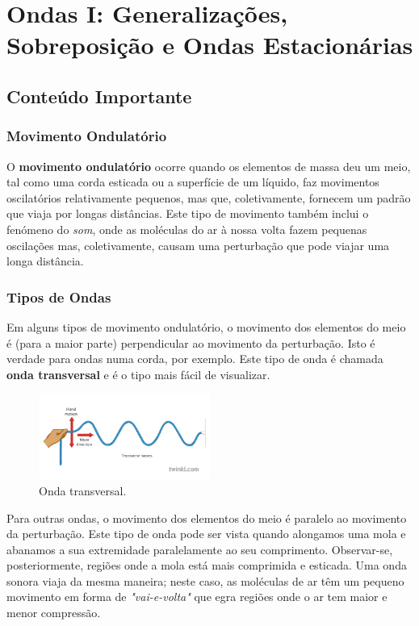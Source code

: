\section{Ondas I: Generalizações, Sobreposição e Ondas Estacionárias}
\subsection{Conteúdo Importante}
\subsubsection{Movimento Ondulatório}

O \textbf{movimento ondulatório} ocorre quando os elementos de massa deu um meio, tal como uma corda esticada ou a superfície de um líquido, faz movimentos oscilatórios relativamente pequenos, mas que, coletivamente, fornecem um padrão que viaja por longas distâncias. Este tipo de movimento também inclui o fenómeno do \emph{som}, onde as moléculas do ar à nossa volta fazem pequenas oscilações mas, coletivamente, causam uma perturbação que pode viajar uma longa distância.

\subsubsection{Tipos de Ondas}
Em alguns tipos de movimento ondulatório, o movimento dos elementos do meio é (para a maior parte) perpendicular ao movimento da perturbação. Isto é verdade para ondas numa corda, por exemplo. Este tipo de onda é chamada \textbf{onda transversal} e é o tipo mais fácil de visualizar.

\begin{figure}[h!]
    \centering
    \includegraphics[width=0.5\textwidth]{11/fig/Transverse-Waves.png}
    \caption{Onda transversal.}
\end{figure}

Para outras ondas, o movimento dos elementos do meio é paralelo ao movimento da perturbação. Este tipo de onda pode ser vista quando alongamos uma mola e abanamos a sua extremidade paralelamente ao seu comprimento. Observar-se, posteriormente, regiões onde a mola está mais comprimida e esticada. Uma onda sonora viaja da mesma maneira; neste caso, as moléculas de ar têm um pequeno movimento em forma de \emph{"vai-e-volta"} que egra regiões onde o ar tem maior e menor compressão.

